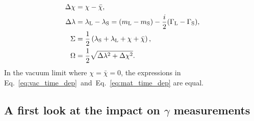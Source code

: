 \begin{align} 
\begin{split}
 \label{eq:mat_param}
\Delta \chi &= \chi - \bar \chi, \\
\Delta \lambda &= \lambda_{\rm L} - \lambda_{\rm S} = (m_{\rm L} - m_{\rm S}) - \frac{i}{2}(\Gamma_{\rm L} - \Gamma_{\rm S}),
\\ 
 \Sigma & = \frac{1}{2}\left(\lambda_{\rm S} + \lambda_{\rm L} + \chi + \bar \chi\right), \\
 \Omega &= \frac{1}{2}\sqrt{\Delta \lambda^2 + \Delta \chi^2}.
\end{split}
\end{align}
In the vacuum limit where $\chi=\bar\chi=0$, the expressions in Eq.~\eqref{eq:vac_time_dep}~and~Eq.~\eqref{eq:mat_time_dep} are equal. 


\subsection{\texorpdfstring{A first look at the impact on $\gamma$ measurements}{A first look at the impact on gamma measurements}} %
\label{sub:a_first_look_at_the_impact_on_gamma}




